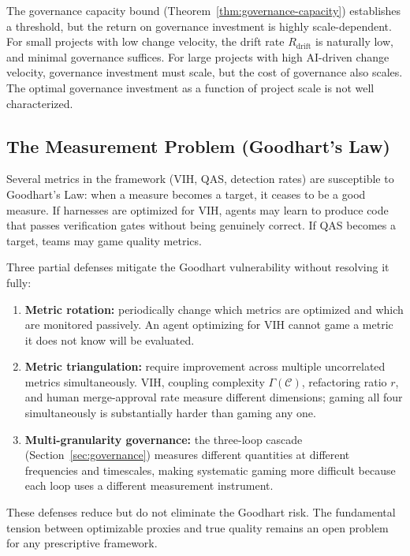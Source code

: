 \documentclass[11pt, a4paper, logo, copyright]{googledeepmind}
\begin{document}
The governance capacity bound (Theorem~\ref{thm:governance-capacity}) establishes a threshold, but the return on governance investment is highly scale-dependent. For small projects with low change velocity, the drift rate $R_{\text{drift}}$ is naturally low, and minimal governance suffices. For large projects with high AI-driven change velocity, governance investment must scale, but the cost of governance also scales. The optimal governance investment as a function of project scale is not well characterized.

\subsection{The Measurement Problem (Goodhart's Law)}

Several metrics in the framework (VIH, QAS, detection rates) are susceptible to Goodhart's Law: when a measure becomes a target, it ceases to be a good measure. If harnesses are optimized for VIH, agents may learn to produce code that passes verification gates without being genuinely correct. If QAS becomes a target, teams may game quality metrics.

Three partial defenses mitigate the Goodhart vulnerability without resolving it fully:
\begin{enumerate}[nosep]
    \item \textbf{Metric rotation:} periodically change which metrics are optimized and which are monitored passively. An agent optimizing for VIH cannot game a metric it does not know will be evaluated.
    \item \textbf{Metric triangulation:} require improvement across multiple uncorrelated metrics simultaneously. VIH, coupling complexity $\Gamma(\mathcal{C})$, refactoring ratio $r$, and human merge-approval rate measure different dimensions; gaming all four simultaneously is substantially harder than gaming any one.
    \item \textbf{Multi-granularity governance:} the three-loop cascade (Section~\ref{sec:governance}) measures different quantities at different frequencies and timescales, making systematic gaming more difficult because each loop uses a different measurement instrument.
\end{enumerate}
These defenses reduce but do not eliminate the Goodhart risk. The fundamental tension between optimizable proxies and true quality remains an open problem for any prescriptive framework.


\end{document}

